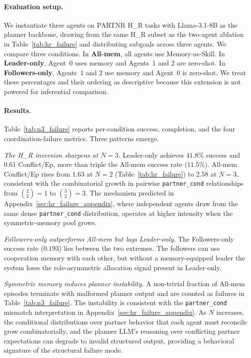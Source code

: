 \documentclass{article}
\theoremstyle{plain}
\theoremstyle{definition}
\theoremstyle{remark}
\begin{document}
\paragraph{Evaluation setup.} We instantiate three agents on PARTNR H\_R tasks with Llama-3.1-8B as the planner backbone, drawing from the same H\_R subset as the two-agent ablation in Table~\ref{tab:hr_failure} and distributing subgoals across three agents. We compare three conditions. In \textbf{All-mem}, all agents use Memory-as-Skill. In \textbf{Leader-only}, Agent~0 uses memory and Agents~1 and 2 are zero-shot. In \textbf{Followers-only}, Agents~1 and 2 use memory and Agent~0 is zero-shot. We treat these percentages and their ordering as descriptive because this extension is not powered for inferential comparison.

\paragraph{Results.} Table~\ref{tab:n3_failure} reports per-condition success, completion, and the four coordination-failure metrics. Three patterns emerge.

\textit{The H\_R inversion sharpens at $N{=}3$.} Leader-only achieves $41.8\%$ success and $0.61$ Conflict/Ep, more than triple the All-mem success rate ($11.5\%$). All-mem Conflict/Ep rises from $1.63$ at $N{=}2$ (Table~\ref{tab:hr_failure}) to $2.58$ at $N{=}3$, consistent with the combinatorial growth in pairwise \texttt{partner\_cond} relationships from $\binom{2}{2}{=}1$ to $\binom{3}{2}{=}3$. The mechanism predicted in Appendix~\ref{sec:hr_failure_appendix}, where independent agents draw from the same dense \texttt{partner\_cond} distribution, operates at higher intensity when the symmetric-memory pool grows.

\textit{Followers-only outperforms All-mem but lags Leader-only.} The Followers-only success rate ($0.193$) lies between the two extremes. The followers can use cooperation memory with each other, but without a memory-equipped leader the system loses the role-asymmetric allocation signal present in Leader-only.

\textit{Symmetric memory induces planner instability.} A non-trivial fraction of All-mem episodes terminate with malformed planner output and are counted as failures in Table~\ref{tab:n3_failure}. The instability is consistent with the \texttt{partner\_cond} mismatch interpretation in Appendix~\ref{sec:hr_failure_appendix}. As $N$ increases, the conditional distributions over partner behavior that each agent must reconcile grow combinatorially, and the planner LLM's reasoning over conflicting partner expectations can degrade to invalid structured output, providing a behavioral signature of the structural failure mode.
\end{document}
